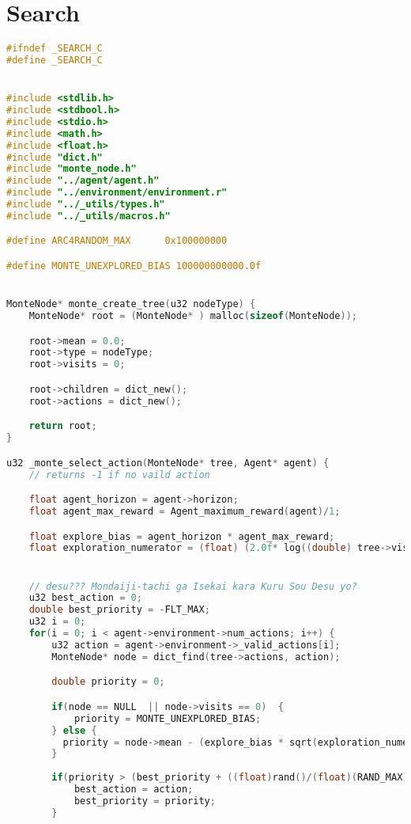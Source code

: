 \documentclass[fancychapters]{report}   	%
\begin{document}
\section{Search}
\begin{lstlisting}[language=C,caption={search.c}]
#ifndef _SEARCH_C
#define _SEARCH_C


#include <stdlib.h>
#include <stdbool.h>
#include <stdio.h>
#include <math.h>
#include <float.h>
#include "dict.h"
#include "monte_node.h"
#include "../agent/agent.h"
#include "../environment/environment.r"
#include "../_utils/types.h"
#include "../_utils/macros.h"

#define ARC4RANDOM_MAX      0x100000000

#define MONTE_UNEXPLORED_BIAS 100000000000.0f


MonteNode* monte_create_tree(u32 nodeType) {
    MonteNode* root = (MonteNode* ) malloc(sizeof(MonteNode));

    root->mean = 0.0;
    root->type = nodeType;
    root->visits = 0;

    root->children = dict_new();
    root->actions = dict_new();

    return root;
}

u32 _monte_select_action(MonteNode* tree, Agent* agent) {
    // returns -1 if no vaild action

    float agent_horizon = agent->horizon;
    float agent_max_reward = Agent_maximum_reward(agent)/1;

    float explore_bias = agent_horizon * agent_max_reward;
    float exploration_numerator = (float) (2.0f* log((double) tree->visits));


    // desu??? Mondaiji-tachi ga Isekai kara Kuru Sou Desu yo?
    u32 best_action = 0;
    double best_priority = -FLT_MAX;
    u32 i = 0;
    for(i = 0; i < agent->environment->num_actions; i++) {
        u32 action = agent->environment->_valid_actions[i];
        MonteNode* node = dict_find(tree->actions, action);

        double priority = 0;

        if(node == NULL  || node->visits == 0)  {
            priority = MONTE_UNEXPLORED_BIAS;
        } else {
          priority = node->mean - (explore_bias * sqrt(exploration_numerator / node->visits));
        }
	
        if(priority > (best_priority + ((float)rand()/(float)(RAND_MAX)) * 0.001)) {
            best_action = action;
            best_priority = priority;
        }


\end{lstlisting}
\end{document}
